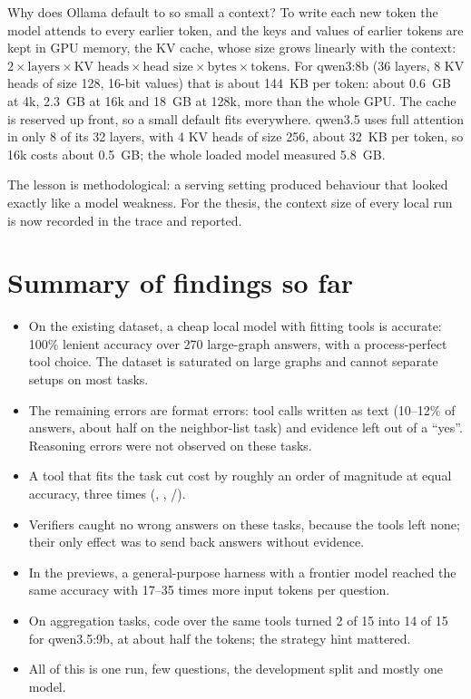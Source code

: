 Why does Ollama default to so small a context? To write each new token the model attends to every earlier token, and
the keys and values of earlier tokens are kept in GPU memory, the KV cache, whose size grows linearly with the context:
$2 \times \text{layers} \times \text{KV heads} \times \text{head size} \times \text{bytes} \times \text{tokens}$. For
qwen3:8b (36 layers, 8 KV heads of size 128, 16-bit values) that is about 144~KB per token: about 0.6~GB at 4k, 2.3~GB
at 16k and 18~GB at 128k, more than the whole GPU. The cache is reserved up front, so a small default fits everywhere.
qwen3.5 uses full attention in only 8 of its 32 layers, with 4 KV heads of size 256, about 32~KB per token, so 16k
costs about 0.5~GB; the whole loaded model measured 5.8~GB.

The lesson is methodological: a serving setting produced behaviour that looked exactly like a model weakness. For
the thesis, the context size of every local run is now recorded in the trace and reported.

\section{Summary of findings so far}

\begin{itemize}
  \item On the existing dataset, a cheap local model with fitting tools is accurate: 100\% lenient accuracy over 270
        large-graph answers, with a process-perfect tool choice. The dataset is saturated on large graphs and cannot
        separate setups on most tasks.
  \item The remaining errors are format errors: tool calls written as text (10--12\% of answers, about half on the
        neighbor-list task) and evidence left out of a ``yes''. Reasoning errors were not observed on these tasks.
  \item A tool that fits the task cut cost by roughly an order of magnitude at equal accuracy, three times
        (, , /).
  \item Verifiers caught no wrong answers on these tasks, because the tools left none; their only effect was to send
        back answers without evidence.
  \item In the previews, a general-purpose harness with a frontier model reached the same accuracy with 17--35 times
        more input tokens per question.
  \item On aggregation tasks, code over the same tools turned 2 of 15 into 14 of 15 for qwen3.5:9b, at about half the
        tokens; the strategy hint mattered.
  \item All of this is one run, few questions, the development split and mostly one model.
\end{itemize}
